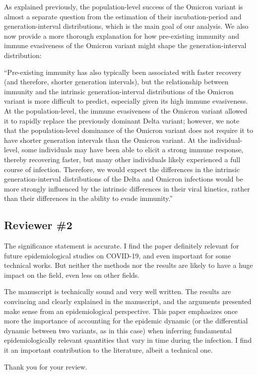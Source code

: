 \documentclass[12pt]{article}
\newcommand{\rev}{\subsection*}
\newcommand{\revtext}{\textsf}
\begin{document}
As explained previously, the population-level success of the Omicron variant is almost a separate question from the estimation of their incubation-period and generation-interval distributions, which is the main goal of our analysis. We also now provide a more thorough explanation for how pre-existing immunity and immune evasiveness of the Omicron variant might shape the generation-interval distribution: 

``Pre-existing immunity has also typically been associated with faster recovery \citep{kissler2021viral} (and therefore, shorter generation intervals), but the relationship between immunity and the intrinsic generation-interval distributions of the Omicron variant is more difficult to predict, especially given its high immune evasiveness.
At the population-level, the immune evasiveness of the Omicron variant allowed it to rapidly replace the previously dominant Delta variant;
however, we note that the population-level dominance of the Omicron variant does not require it to have shorter generation intervals than the Omicron variant.
At the individual-level, some individuals may have been able to elicit a strong immune response, thereby recovering faster, but many other individuals likely experienced a full course of infection.
Therefore, we would expect the differences in the intrinsic generation-interval distributions of the Delta and Omicron infections would be more strongly influenced by the intrinsic differences in their viral kinetics, rather than their differences in the ability to evade immunity.''

\rev{Reviewer \#2}

\revtext{The significance statement is accurate. I find the paper definitely relevant for future epidemiological studies on COVID-19, and even important for some technical works. But neither the methods nor the results are likely to have a huge impact on the field, even less on other fields.}

\revtext{The manuscript is technically sound and very well written. The results are convincing and clearly explained in the manuscript, and the arguments presented make sense from an epidemiological perspective. This paper emphasizes once more the importance of accounting for the epidemic dynamic (or the differential dynamic between two variants, as in this case) when inferring fundamental epidemiologically relevant quantities that vary in time during the infection. I find it an important contribution to the literature, albeit a technical one.}

Thank you for your review.


\end{document}
